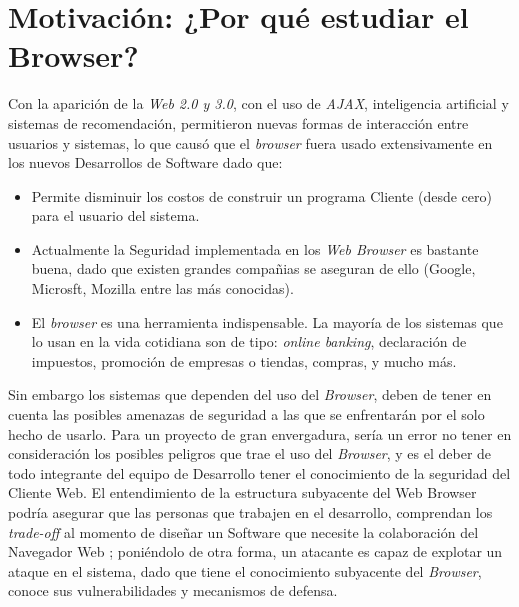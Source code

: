 \section{Motivación: ¿Por qué estudiar el Browser?}
\label{chap1:motiv}

Con la aparición de la \textit{Web 2.0 y 3.0}, con el uso de \textit{AJAX}, inteligencia artificial y sistemas de recomendación, permitieron nuevas formas de interacción entre usuarios y sistemas, lo que causó que el \textit{browser} fuera usado extensivamente en los nuevos Desarrollos de Software dado que:
\begin{itemize}
	\item Permite disminuir los costos de construir un programa Cliente (desde cero) para el usuario del sistema.
	\item Actualmente la Seguridad implementada en los \textit{Web Browser} es bastante buena, dado que existen grandes compañias se aseguran de ello (Google, Microsft, Mozilla entre las más conocidas). 
	\item El \textit{browser} es una herramienta indispensable. La mayoría de los sistemas que lo usan en la vida cotidiana son de tipo: \textit{online banking}, declaración de impuestos, promoción de empresas o tiendas, compras, y mucho más.
\end{itemize}

Sin embargo los sistemas que dependen del uso del \textit{Browser}, deben de tener en cuenta las posibles amenazas de seguridad a las que se enfrentarán por el solo hecho de usarlo. Para un proyecto de gran envergadura, sería un error no tener en consideración los posibles peligros que trae el uso del \textit{Browser}, y es el deber de todo integrante del equipo de Desarrollo tener el conocimiento de la seguridad del Cliente Web. El entendimiento de la estructura subyacente del Web Browser podría asegurar que las personas que trabajen en el desarrollo, comprendan los \textit{trade-off} al momento de diseñar un Software que necesite la colaboración del Navegador Web \cite{535061, 2005-grosskurth-browser-refarch,preprint-grosskurth-browser-archevol}; poniéndolo de otra forma, un atacante es capaz de explotar un ataque en el sistema, dado que tiene el conocimiento subyacente del \textit{Browser}, conoce sus vulnerabilidades y mecanismos de defensa.

